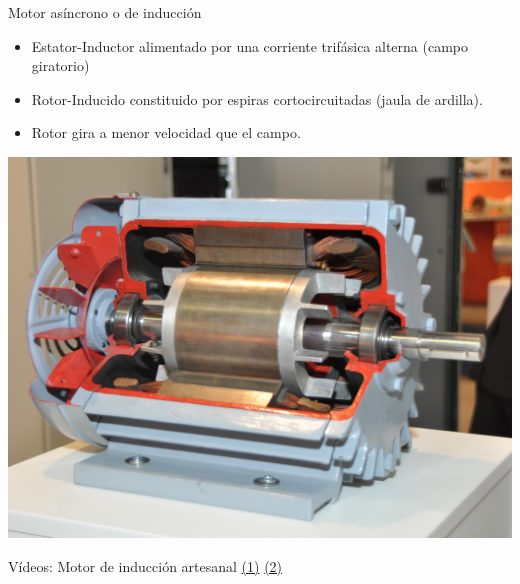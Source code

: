 \documentclass[xcolor={usenames,svgnames,dvipsnames}]{beamer}
\begin{document}
\begin{frame}[label={sec:org4e8b5a8}]{Motor asíncrono o de inducción}
\begin{itemize}
\item Estator-Inductor alimentado por una corriente trifásica alterna (campo giratorio)

\item Rotor-Inducido constituido por espiras cortocircuitadas (jaula de
ardilla).

\item Rotor gira a menor velocidad que el campo.
\end{itemize}

\begin{center}
\includegraphics[height=0.5\textheight]{../figs/Seccion_Motor.jpeg}
\end{center}

Vídeos: Motor de inducción artesanal \href{http://www.youtube.com/watch?v=ZRGlAu0uCHY\&feature=related}{(1)} \href{http://www.youtube.com/watch?v=P-eTLmJC2cQ}{(2)}
\end{frame}
\end{document}
